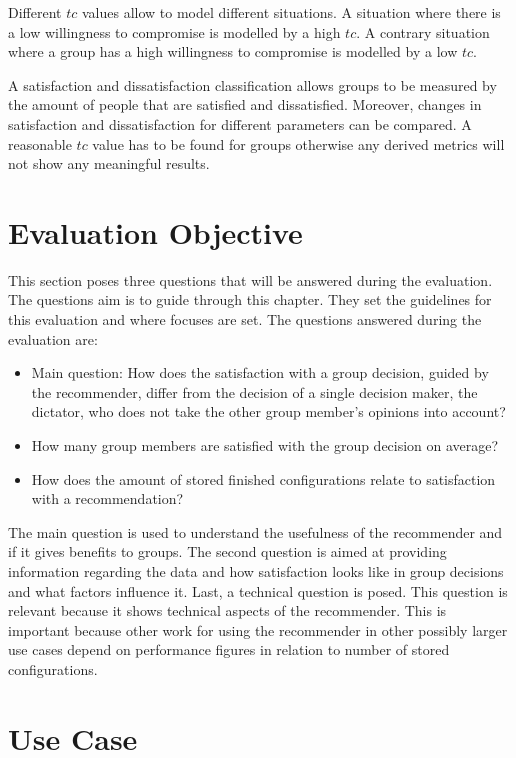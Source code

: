 Different $tc$ values allow to model different situations. A situation where there is a low willingness to compromise is modelled by a high $tc$. A contrary situation where a group has a high willingness to compromise is modelled by a low $tc$.

A satisfaction and dissatisfaction classification allows groups to be measured by the amount of people that are satisfied and dissatisfied. Moreover, changes in satisfaction and dissatisfaction for different parameters can be compared. A reasonable $tc$ value has to be found for groups otherwise any derived metrics will not show any meaningful results.

\section{Evaluation Objective}
\label{sec:Evaluation:Questions}

This section poses three questions that will be answered during the evaluation. The questions aim is to guide through this chapter. They set the guidelines for this evaluation and where focuses are set. The questions answered during the evaluation are:

\begin{itemize}
    \item Main question: How does the satisfaction with a group decision, guided by the recommender, differ from the decision of a single decision maker, the dictator, who does not take the other group member's opinions into account?
    \item How many group members are satisfied with the group decision on average?
    \item How does the amount of stored finished configurations relate to satisfaction with a recommendation?
\end{itemize}

The main question is used to understand the usefulness of the recommender and if it gives benefits to groups. The second question is aimed at providing information regarding the data and how satisfaction looks like in group decisions and what factors influence it. Last, a technical question is posed. This question is relevant because it shows technical aspects of the recommender. This is important because other work for using the recommender in other possibly larger use cases depend on performance figures in relation to number of stored configurations.

\section{Use Case}
\label{sec:Evaluation:UseCase}

